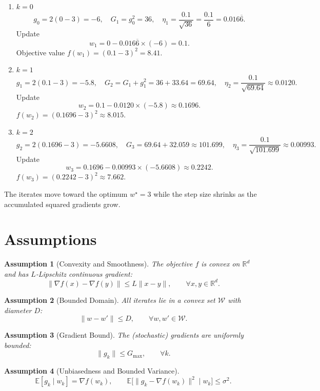 \documentclass{article}
\newtheorem{assumption}{Assumption}
\newcommand{\E}{\mathbb{E}}
\newcommand{\R}{\mathbb{R}}
\begin{document}
\begin{enumerate}[label=Iter~\arabic*:, leftmargin=*]
\item $k=0$  
\[
g_0 = 2(0-3) = -6,\quad 
G_1 = g_0^2 = 36,\quad 
\eta_1 = \frac{0.1}{\sqrt{36}} = \frac{0.1}{6}=0.016\overline{6}.
\]  
Update  
\[
w_1 = 0 - 0.016\overline{6}\times (-6)=0.1.
\]  
Objective value $f(w_1) = (0.1-3)^2 = 8.41$.

\item $k=1$  
\[
g_1 = 2(0.1-3)= -5.8,\quad 
G_2 = G_1+g_1^2 = 36+33.64 = 69.64,\quad 
\eta_2 = \frac{0.1}{\sqrt{69.64}} \approx 0.0120.
\]  
Update  
\[
w_2 = 0.1 - 0.0120\times (-5.8) \approx 0.1696.
\]  
$f(w_2) = (0.1696-3)^2 \approx 8.015$.

\item $k=2$  
\[
g_2 = 2(0.1696-3)= -5.6608,\quad 
G_3 = 69.64 + 32.059 \approx 101.699,\quad 
\eta_3 = \frac{0.1}{\sqrt{101.699}} \approx 0.00993.
\]  
Update  
\[
w_3 = 0.1696 - 0.00993\times (-5.6608) \approx 0.2242.
\]  
$f(w_3) = (0.2242-3)^2 \approx 7.662$.
\end{enumerate}
The iterates move toward the optimum $w^\star=3$ while the step size shrinks as the
accumulated squared gradients grow.

\newpage
\section*{Assumptions}
\begin{assumption}[Convexity and Smoothness]\label{as:convex}
The objective $f$ is convex on $\R^{d}$ and has $L$‑Lipschitz continuous gradient:
\[
\|\nabla f(x)-\nabla f(y)\|\le L\|x-y\|,\qquad\forall x,y\in\R^{d}.
\]
\end{assumption}
\begin{assumption}[Bounded Domain]\label{as:domain}
All iterates lie in a convex set $\mathcal{W}$ with diameter $D$:
\[
\|w-w'\|\le D,\qquad\forall w,w'\in\mathcal{W}.
\]
\end{assumption}
\begin{assumption}[Gradient Bound]\label{as:grad}
The (stochastic) gradients are uniformly bounded:
\[
\|g_k\|\le G_{\max},\qquad\forall k.
\]
\end{assumption}
\begin{assumption}[Unbiasedness and Bounded Variance]\label{as:noise}
\[
\E[g_k\mid w_k]=\nabla f(w_k),\qquad
\E\big[\|g_k-\nabla f(w_k)\|^2\mid w_k\big]\le\sigma^2 .
\]
\end{assumption}
\end{document}

